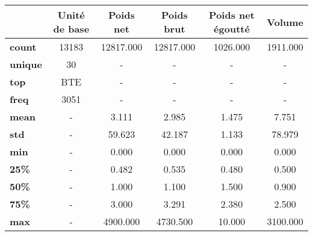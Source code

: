 \begin{tabular}{lccccc}
\toprule
{} & Unité de base &  Poids net &  Poids brut &  Poids net égoutté &    Volume \\
\midrule
\textbf{count } &         13183 &  12817.000 &   12817.000 &           1026.000 &  1911.000 \\
\textbf{unique} &            30 &          - &           - &                  - &         - \\
\textbf{top   } &           BTE &          - &           - &                  - &         - \\
\textbf{freq  } &          3051 &          - &           - &                  - &         - \\
\textbf{mean  } &             - &      3.111 &       2.985 &              1.475 &     7.751 \\
\textbf{std   } &             - &     59.623 &      42.187 &              1.133 &    78.979 \\
\textbf{min   } &             - &      0.000 &       0.000 &              0.000 &     0.000 \\
\textbf{25\%   } &             - &      0.482 &       0.535 &              0.480 &     0.500 \\
\textbf{50\%   } &             - &      1.000 &       1.100 &              1.500 &     0.900 \\
\textbf{75\%   } &             - &      3.000 &       3.291 &              2.380 &     2.500 \\
\textbf{max   } &             - &   4900.000 &    4730.500 &             10.000 &  3100.000 \\
\bottomrule
\end{tabular}
